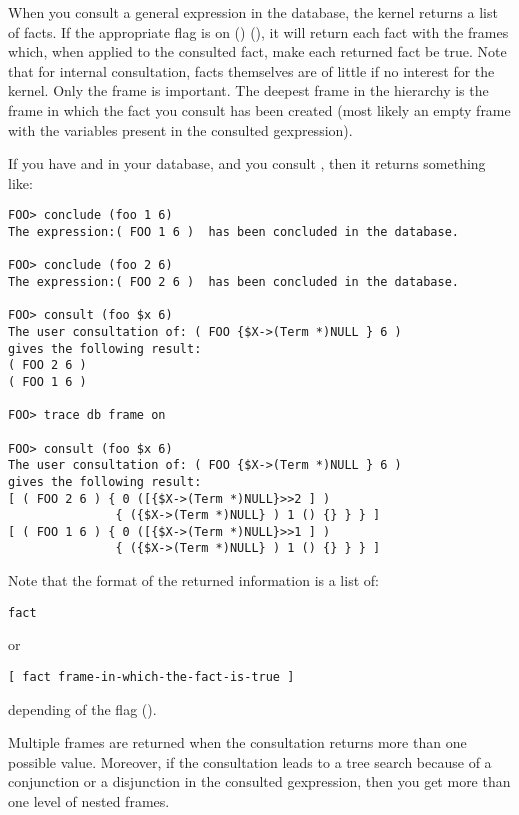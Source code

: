 When you consult a general expression in the database, the kernel returns a
list of facts. If the appropriate flag is on ()
(), it will return each fact with the frames
which, when applied to the consulted fact, make each returned fact be true.
Note that for internal consultation, facts themselves are of little if no
interest for the kernel. Only the frame is important. The deepest frame in the
hierarchy is the frame in which the fact you consult has been created (most
likely an empty frame with the variables present in the consulted gexpression).

If you have  and  in your database, and
you consult , then it returns something like:
\begin{verbatim}
FOO> conclude (foo 1 6)
The expression:( FOO 1 6 )  has been concluded in the database.

FOO> conclude (foo 2 6)
The expression:( FOO 2 6 )  has been concluded in the database.

FOO> consult (foo $x 6)
The user consultation of: ( FOO {$X->(Term *)NULL } 6 ) 
gives the following result:
( FOO 2 6 ) 
( FOO 1 6 ) 

FOO> trace db frame on

FOO> consult (foo $x 6)
The user consultation of: ( FOO {$X->(Term *)NULL } 6 )
gives the following result:
[ ( FOO 2 6 ) { 0 ([{$X->(Term *)NULL}>>2 ] )
               { ({$X->(Term *)NULL} ) 1 () {} } } ]
[ ( FOO 1 6 ) { 0 ([{$X->(Term *)NULL}>>1 ] )
               { ({$X->(Term *)NULL} ) 1 () {} } } ]
\end{verbatim}

Note that the format of the returned information is a list of:
\begin{verbatim}
fact
\end{verbatim}
or
\begin{verbatim}
[ fact frame-in-which-the-fact-is-true ]
\end{verbatim}
depending of the  flag ().

Multiple frames are returned when the consultation returns more than one
possible value. Moreover, if the consultation leads to a tree search
because of a conjunction or a disjunction in the consulted gexpression,
then you get more than one level of nested frames.

